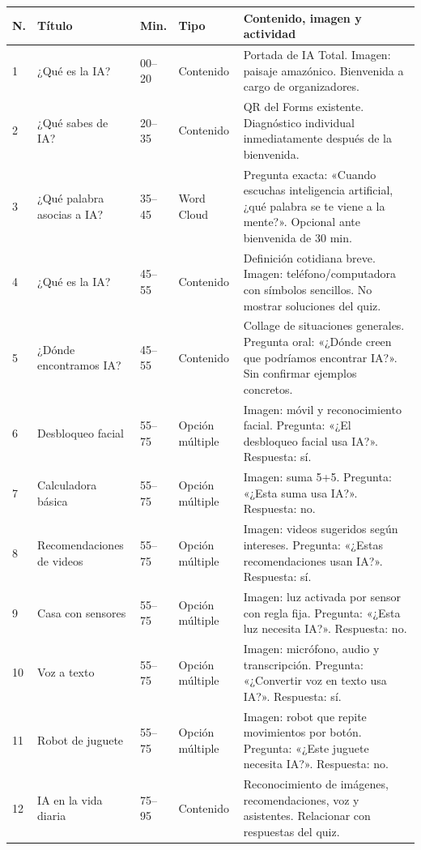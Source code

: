 \documentclass[11pt,a4paper]{article}
\begin{document}
\footnotesize
\begin{longtable}{@{}p{0.55cm}>{\raggedright\arraybackslash}p{2.5cm}p{1.35cm}>{\raggedright\arraybackslash}p{2.0cm}>{\raggedright\arraybackslash}p{6.9cm}@{}}
\toprule \textbf{N.} & \textbf{Título} & \textbf{Min.} & \textbf{Tipo} & \textbf{Contenido, imagen y actividad}\\\midrule\endhead
1 & ¿Qué es la IA? & 00--20 & Contenido & Portada de IA Total. Imagen: paisaje amazónico. Bienvenida a cargo de organizadores.\\
2 & ¿Qué sabes de IA? & 20--35 & Contenido & QR del Forms existente. Diagnóstico individual inmediatamente después de la bienvenida.\\
3 & ¿Qué palabra asocias a IA? & 35--45 & Word Cloud & Pregunta exacta: «Cuando escuchas inteligencia artificial, ¿qué palabra se te viene a la mente?». Opcional ante bienvenida de 30 min.\\
4 & ¿Qué es la IA? & 45--55 & Contenido & Definición cotidiana breve. Imagen: teléfono/computadora con símbolos sencillos. No mostrar soluciones del quiz.\\
5 & ¿Dónde encontramos IA? & 45--55 & Contenido & Collage de situaciones generales. Pregunta oral: «¿Dónde creen que podríamos encontrar IA?». Sin confirmar ejemplos concretos.\\
6 & Desbloqueo facial & 55--75 & Opción múltiple & Imagen: móvil y reconocimiento facial. Pregunta: «¿El desbloqueo facial usa IA?». Respuesta: sí.\\
7 & Calculadora básica & 55--75 & Opción múltiple & Imagen: suma 5+5. Pregunta: «¿Esta suma usa IA?». Respuesta: no.\\
8 & Recomendaciones de videos & 55--75 & Opción múltiple & Imagen: videos sugeridos según intereses. Pregunta: «¿Estas recomendaciones usan IA?». Respuesta: sí.\\
9 & Casa con sensores & 55--75 & Opción múltiple & Imagen: luz activada por sensor con regla fija. Pregunta: «¿Esta luz necesita IA?». Respuesta: no.\\
10 & Voz a texto & 55--75 & Opción múltiple & Imagen: micrófono, audio y transcripción. Pregunta: «¿Convertir voz en texto usa IA?». Respuesta: sí.\\
11 & Robot de juguete & 55--75 & Opción múltiple & Imagen: robot que repite movimientos por botón. Pregunta: «¿Este juguete necesita IA?». Respuesta: no.\\
12 & IA en la vida diaria & 75--95 & Contenido & Reconocimiento de imágenes, recomendaciones, voz y asistentes. Relacionar con respuestas del quiz.\\

\end{longtable}
\end{document}
